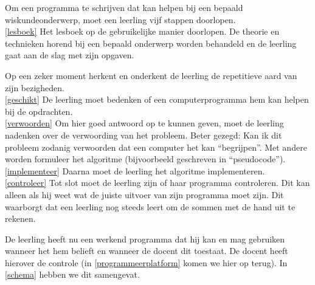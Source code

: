 \documentclass[a4paper]{article}
\newcounter{doen}
\def\doenref#1{\ref{#1}}
\begin{document}
Om een programma te schrijven dat kan helpen bij een bepaald wiskundeonderwerp, moet een leerling vijf stappen doorlopen. \hfill\\
\doenref{lesboek} Het lesboek op de gebruikelijke manier doorlopen. De theorie en technieken horend bij een bepaald onderwerp worden behandeld en de leerling gaat aan de slag met zijn opgaven.

Op een zeker moment herkent en onderkent de leerling de repetitieve aard van zijn bezigheden. \hfill\\
\doenref{geschikt} De leerling moet bedenken of een computerprogramma hem kan helpen bij de opdrachten. \hfill\\
\doenref{verwoorden} Om hier goed antwoord op te kunnen geven, moet de leerling nadenken over de verwoording van het probleem. Beter gezegd: Kan ik dit probleem zodanig verwoorden dat een computer het kan ``begrijpen''. Met andere worden formuleer het algoritme (bijvoorbeeld geschreven in ``pseudocode''). \hfill\\
\doenref{implementeer} Daarna moet de leerling het algoritme implementeren.\hfill\\
\doenref{controleer} Tot slot moet de leerling zijn of haar programma controleren. Dit kan alleen als hij weet wat de juiste uitvoer van zijn programma moet zijn. Dit waarborgt dat een leerling nog steeds leert om de sommen met de hand uit te rekenen. 

De leerling heeft nu een werkend programma dat hij kan en mag gebruiken wanneer het hem belieft en wanneer de docent dit toestaat. De docent heeft hierover de controle (in \autoref{programmeerplatform} komen we hier op terug). In \autoref{schema} hebben we dit samengevat.
\end{document}
